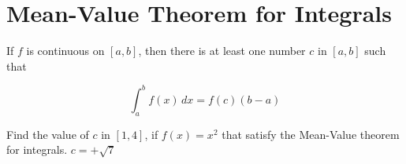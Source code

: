 
\section{Mean-Value Theorem for Integrals}

\begin{myframe}[arc=10pt,auto outer arc]
If $f$ is continuous on $[a, b]$, then there is at least one number $c$
in $[a, b]$ such that

\[
\int_a^b f(x) \, dx = f(c)(b-a)
\]
\end{myframe}

\problemans%
{Find the value of $c$ in $[1, 4]$, if $f(x)=x^2$ that satisfy the Mean-Value theorem for integrals.}%
{$\displaystyle c=+\sqrt{7}$}%

